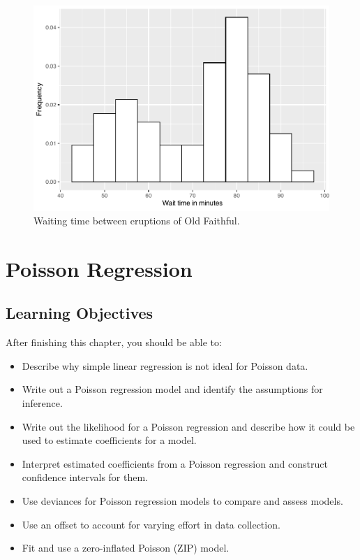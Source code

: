 \documentclass[
]{krantz}
\providecommand{\tightlist}{%
  \setlength{\itemsep}{0pt}\setlength{\parskip}{0pt}}
\begin{document}
\begin{figure}

{\centering \includegraphics[width=0.6\linewidth]{bookdown-BeyondMLR_files/figure-latex/faithful-1} 

}

\caption{Waiting time between eruptions of Old Faithful.}\label{fig:faithful}
\end{figure}

\hypertarget{ch-poissonreg}{%
\chapter{Poisson Regression}\label{ch-poissonreg}}

\hypertarget{learning-objectives-3}{%
\section{Learning Objectives}\label{learning-objectives-3}}

After finishing this chapter, you should be able to:

\begin{itemize}
\tightlist
\item
  Describe why simple linear regression is not ideal for Poisson data.
\item
  Write out a Poisson regression model and identify the assumptions for inference.
\item
  Write out the likelihood for a Poisson regression and describe how it could be used to estimate coefficients for a model.
\item
  Interpret estimated coefficients from a Poisson regression and construct confidence intervals for them.
\item
  Use deviances for Poisson regression models to compare and assess models.
\item
  Use an offset to account for varying effort in data collection.
\item
  Fit and use a zero-inflated Poisson (ZIP) model.
\end{itemize}
\end{document}
